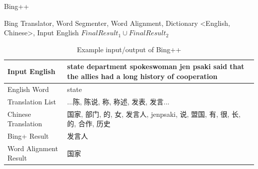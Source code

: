 \begin{CJK}{UTF8}{gbsn}
\begin{algorithm}[ht]
\caption{Bing++}
\label{algorithm:wsd_5}
\begin{algorithmic}
\REQUIRE Bing Translator, Word Segmenter, Word Alignment, Dictionary \textless English, Chinese\textgreater, Input English
        \ENDIF
    \ENDFOR
        \ENDIF
    \ENDFOR
        \ENDIF
    \ENDFOR
\ENDIF
\RETURN $FinalResult_1 \cup FinalResult_2$
\end{algorithmic}
\end{algorithm}

\begin{table}[ht]
    \caption{Example input/output of Bing++}
    \begin{center}
    \begin{tabular}{| p{2.5cm} | p{4cm} |}
        \hline
        Input English & state department spokeswoman jen psaki said that the allies had a long history of cooperation\\
        \hline
        English Word & state \\
        \hline
        Translation List & \parbox[t]{4cm}{...陈, 陈说, 称, 称述, 发表, 发言...}\\
        \hline
        Chinese Translation & 国家, 部门, 的, 女, 发言人, jenpsaki, 说, 盟国, 有, 很, 长, 的, 合作, 历史\\
        \hline
        Bing+ Result & 发言人\\
        \hline
        Word Alignment Result & 国家\\
        \hline
    \end{tabular}
    \end{center}
\end{table}


\end{CJK}
